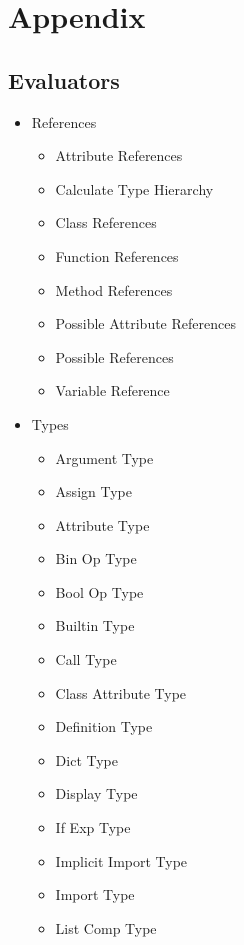 \documentclass[12pt,halfparskip,DIV11,BCOR10mm]{scrreprt}
\begin{document}

\setcounter{secnumdepth}{-1}
\chapter{Appendix}

\section{Evaluators}

\begin{itemize}
    \item References
    \begin{itemize}
        \item Attribute References
        \item Calculate Type Hierarchy
        \item Class References
        \item Function References
        \item Method References
        \item Possible Attribute References
        \item Possible References
        \item Variable Reference
    \end{itemize}
    \item Types
    \begin{itemize}
        \item Argument Type
        \item Assign Type
        \item Attribute Type
        \item Bin Op Type
        \item Bool Op Type
        \item Builtin Type
        \item Call Type
        \item Class Attribute Type
        \item Definition Type
        \item Dict Type
        \item Display Type
        \item If Exp Type
        \item Implicit Import Type
        \item Import Type
        \item List Comp Type

\end{itemize}
\end{itemize}
\end{document}

